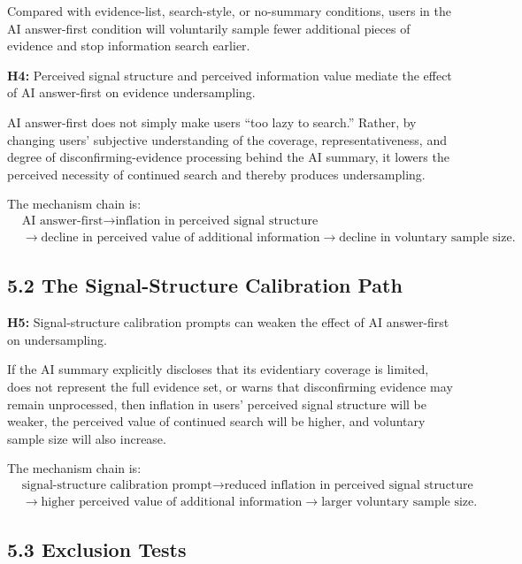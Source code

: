 Compared with evidence-list, search-style, or no-summary conditions, users in the AI answer-first condition will voluntarily sample fewer additional pieces of evidence and stop information search earlier.

\textbf{H4:} Perceived signal structure and perceived information value mediate the effect of AI answer-first on evidence undersampling.

AI answer-first does not simply make users ``too lazy to search.'' Rather, by changing users' subjective understanding of the coverage, representativeness, and degree of disconfirming-evidence processing behind the AI summary, it lowers the perceived necessity of continued search and thereby produces undersampling.

The mechanism chain is:
\[
\begin{aligned}
&\text{AI answer-first}
\rightarrow
\text{inflation in perceived signal structure} \\
&\rightarrow
\text{decline in perceived value of additional information}
\rightarrow
\text{decline in voluntary sample size.}
\end{aligned}
\]

\subsection*{5.2 The Signal-Structure Calibration Path}

\textbf{H5:} Signal-structure calibration prompts can weaken the effect of AI answer-first on undersampling.

If the AI summary explicitly discloses that its evidentiary coverage is limited, does not represent the full evidence set, or warns that disconfirming evidence may remain unprocessed, then inflation in users' perceived signal structure will be weaker, the perceived value of continued search will be higher, and voluntary sample size will also increase.

The mechanism chain is:
\[
\begin{aligned}
&\text{signal-structure calibration prompt}
\rightarrow
\text{reduced inflation in perceived signal structure} \\
&\rightarrow
\text{higher perceived value of additional information}
\rightarrow
\text{larger voluntary sample size.}
\end{aligned}
\]

\subsection*{5.3 Exclusion Tests}


